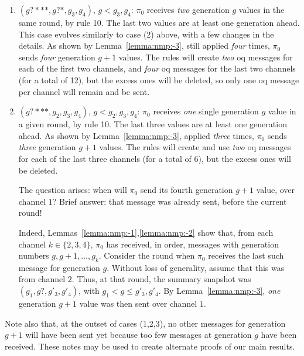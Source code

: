 \begin{remark}
\begin{enumerate}
    \medskip
    \item $(g?***, g?*, g_3, g_4)$, $g < g_3, g_4$: 
    $\pi_0$ receives \emph{two} generation $g$ values in the same round, by rule 10.
    The last two values are at least one generation ahead.    
    This case evolves similarly to case (2) above, with a few changes in the details.
    As shown by Lemma~\ref{lemma:nmp:-3}, still applied \emph{four} times, 
    $\pi_0$ sends \emph{four} generation $g+1$ values.
    The rules will create \emph{two} \gls{oq} messages for each of the first two channels,
    and \emph{four} \gls{oq} messages for the last two channels (for a total of 12),
    but the excess ones will be deleted, so only one \gls{oq} message per channel will remain and be sent.
    
    \medskip
    \item $(g?***, g_2, g_3, g_4)$, $g < g_2, g_3, g_4$: 
    $\pi_0$ receives \emph{one} single generation $g$ value in a given round, by rule 10.
    The last three values are at least one generation ahead.
    As shown by Lemma~\ref{lemma:nmp:-3}, applied \emph{three} times, 
    $\pi_0$ sends \emph{three} generation $g+1$ values.
    The rules will create and use \emph{two} \gls{oq} messages for each of the last three channels (for a total of 6), but the excess ones will be deleted.
    
    \medskip
    The question arises: when will $\pi_0$ send its fourth generation $g+1$ value, over channel $1$? Brief answer: that message was already sent,
    before the current round!
    
    \medskip
    Indeed, Lemmas~\ref{lemma:nmp:-1},\ref{lemma:nmp:-2} show that,
    from each channel $k \in \{ 2, 3, 4\}$, 
    $\pi_0$ has received, in order, 
    messages with generation numbers $g, g+1, \ldots, g_k$.
    Consider the round when $\pi_0$ receives the last such message for generation $g$. Without loss of generality, assume that this was from channel $2$.
    Thus, at that round, the summary snapshot was $(g_1, g?, g'_3, g'_4)$,
    with $g_1 < g \leq g'_3, g'_4$.
    By Lemma~\ref{lemma:nmp:-3}, \emph{one} generation $g+1$ value was then sent over channel $1$.
    \end{enumerate}    
    
    Note also that, at the outset of cases (1,2,3), no other messages for generation $g+1$ will have been sent yet because too few messages at generation $g$ have been received. 
    These notes may be used to create alternate proofs of our main results.

\end{remark}

